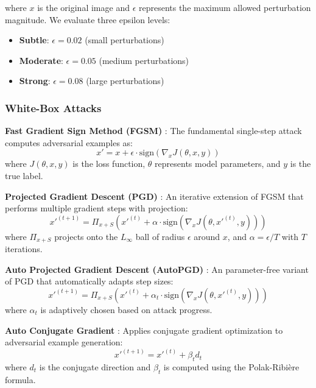 where $x$ is the original image and $\epsilon$ represents the maximum allowed perturbation magnitude. We evaluate three epsilon levels:
\begin{itemize}
    \item \textbf{Subtle}: $\epsilon = 0.02$ (small perturbations)
    \item \textbf{Moderate}: $\epsilon = 0.05$ (medium perturbations)
    \item \textbf{Strong}: $\epsilon = 0.08$ (large perturbations)
\end{itemize}

\subsubsection{White-Box Attacks}

\textbf{Fast Gradient Sign Method (FGSM)} \cite{goodfellow2014explaining}: The fundamental single-step attack computes adversarial examples as:
\begin{equation}
x' = x + \epsilon \cdot \text{sign}(\nabla_x J(\theta, x, y))
\end{equation}
where $J(\theta, x, y)$ is the loss function, $\theta$ represents model parameters, and $y$ is the true label.

\textbf{Projected Gradient Descent (PGD)} \cite{madry2017towards}: An iterative extension of FGSM that performs multiple gradient steps with projection:
\begin{equation}
x'^{(t+1)} = \Pi_{x+S} \left( x'^{(t)} + \alpha \cdot \text{sign}(\nabla_x J(\theta, x'^{(t)}, y)) \right)
\end{equation}
where $\Pi_{x+S}$ projects onto the $L_\infty$ ball of radius $\epsilon$ around $x$, and $\alpha = \epsilon/T$ with $T$ iterations.

\textbf{Auto Projected Gradient Descent (AutoPGD)} \cite{croce2020reliable}: An parameter-free variant of PGD that automatically adapts step sizes:
\begin{equation}
x'^{(t+1)} = \Pi_{x+S} \left( x'^{(t)} + \alpha_t \cdot \text{sign}(\nabla_x J(\theta, x'^{(t)}, y)) \right)
\end{equation}
where $\alpha_t$ is adaptively chosen based on attack progress.

\textbf{Auto Conjugate Gradient} \cite{yamamura2022auto}: Applies conjugate gradient optimization to adversarial example generation:
\begin{equation}
x'^{(t+1)} = x'^{(t)} + \beta_t d_t
\end{equation}
where $d_t$ is the conjugate direction and $\beta_t$ is computed using the Polak-Ribière formula.


